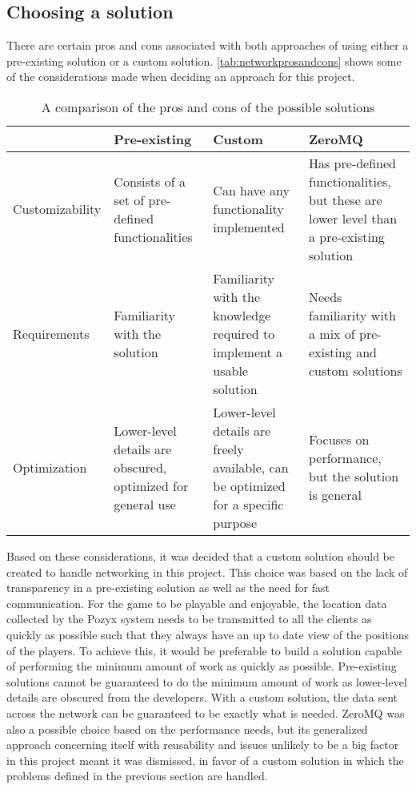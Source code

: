 \subsection{Choosing a solution}
There are certain pros and cons associated with both approaches of using either a pre-existing solution or a custom solution.
\autoref{tab:networkprosandcons} shows some of the considerations made when deciding an approach for this project.
\begin{table}[tbp]
    \begin{tabularx}{\textwidth}{|X|X|X|X|}
    \hline
                    & Pre-existing                                                & Custom                                                                            & ZeroMQ                                                                                  \\ \hline
    Customizability & Consists of a set of pre-defined functionalities            & Can have any functionality implemented                                            & Has pre-defined functionalities, but these are lower level than a pre-existing solution \\ \hline
    Requirements    & Familiarity with the solution                               & Familiarity with the knowledge required to implement a usable solution            & Needs familiarity with a mix of pre-existing and custom solutions                     \\ \hline
    Optimization    & Lower-level details are obscured, optimized for general use & Lower-level details are freely available, can be optimized for a specific purpose & Focuses on performance, but the solution is general                                     \\ \hline
    \end{tabularx}
    \caption{A comparison of the pros and cons of the possible solutions}
    \label{tab:networkprosandcons}
\end{table}
Based on these considerations, it was decided that a custom solution should be created to handle networking in this project.
This choice was based on the lack of transparency in a pre-existing solution as well as the need for fast communication.
For the game to be playable and enjoyable, the location data collected by the Pozyx system needs to be transmitted to all the clients as quickly as possible such that they always have an up to date view of the positions of the players.
To achieve this, it would be preferable to build a solution capable of performing the minimum amount of work as quickly as possible.
Pre-existing solutions cannot be guaranteed to do the minimum amount of work as lower-level details are obscured from the developers.
With a custom solution, the data sent across the network can be guaranteed to be exactly what is needed.
ZeroMQ was also a possible choice based on the performance needs, but its generalized approach concerning itself with reusability and issues unlikely to be a big factor in this project meant it was dismissed, in favor of a custom solution in which the problems defined in the previous section are handled.

